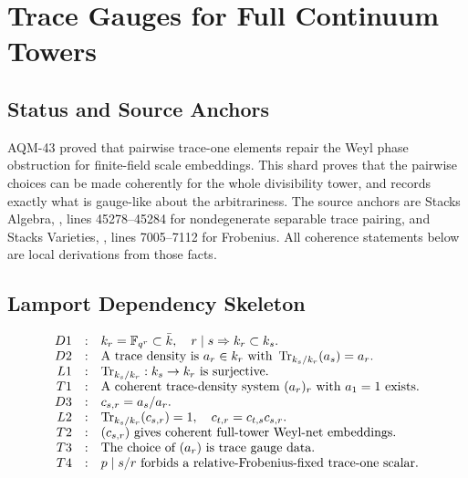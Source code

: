 
\section{Trace Gauges for Full Continuum Towers}
\label{sec:trace-gauges-full-continuum-towers}

\subsection{Status and Source Anchors}

AQM-43 proved that pairwise trace-one elements repair the Weyl phase
obstruction for finite-field scale embeddings.  This shard proves that the
pairwise choices can be made coherently for the whole divisibility tower, and
records exactly what is gauge-like about the arbitrariness.  The source
anchors are Stacks Algebra,
, lines
45278--45284 for nondegenerate separable trace pairing, and Stacks Varieties,
, lines
7005--7112 for Frobenius.  All coherence statements below are local
derivations from those facts.

\subsection{Lamport Dependency Skeleton}

\[
\begin{array}{rcl}
D1&:&k_r=\mathbb F_{q^r}\subset\bar k,\quad r\mid s\Rightarrow k_r\subset k_s.\\
D2&:&\text{A trace density is }a_r\in k_r\text{ with }
      \operatorname{Tr}_{k_s/k_r}(a_s)=a_r.\\
L1&:&\operatorname{Tr}_{k_s/k_r}:k_s\to k_r\text{ is surjective.}\\
T1&:&\text{A coherent trace-density system }(a_r)_r\text{ with }a_1=1
      \text{ exists.}\\
D3&:&c_{s,r}=a_s/a_r.\\
L2&:&\operatorname{Tr}_{k_s/k_r}(c_{s,r})=1,\quad
      c_{t,r}=c_{t,s}c_{s,r}.\\
T2&:&(c_{s,r})\text{ gives coherent full-tower Weyl-net embeddings.}\\
T3&:&\text{The choice of }(a_r)\text{ is trace gauge data.}\\
T4&:&p\mid s/r\text{ forbids a relative-Frobenius-fixed trace-one scalar.}
\end{array}
\]

